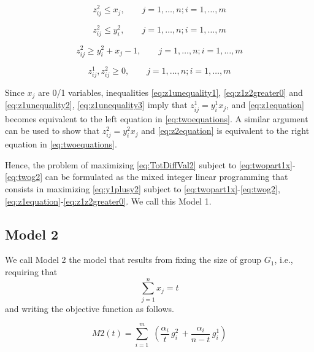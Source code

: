 \begin{equation}
z_{ij}^2 \leq x_j, \quad \quad j=1,\dots,n; i=1,\dots, m
\label{eq:z2unequality1}
\end{equation}

\begin{equation}
z_{ij}^2 \leq y_i^2, \quad \quad j=1,\dots,n; i=1,\dots, m
\label{eq:zoom2unequality2}
\end{equation}

\begin{equation}
z_{ij}^2 \geq y_i^2+x_j-1, \quad \quad j=1,\dots,n; i=1,\dots, m
\label{eq:z2unequality3}
\end{equation}

\begin{equation}
z_{ij}^1, z_{ij}^2 \geq 0, \quad \quad j=1,\dots,n; i=1,\dots, m
\label{eq:z1z2greater0}
\end{equation}

Since \(x_j\) are 0/1 variables, inequalities \eqref{eq:z1unequality1}, \eqref{eq:z1z2greater0} and \eqref{eq:z1unequality2}, \eqref{eq:z1unequality3} imply that \(z_{ij}^1=y_i^1 x_j\), and \eqref{eq:z1equation} becomes equivalent to the left equation in \eqref{eq:twoequations}. A similar argument can be used to show that \(z_{ij}^2=y_i^2 x_j\) and \eqref{eq:z2equation} is equivalent to the right equation in \eqref{eq:twoequations}.

Hence, the problem of maximizing \eqref{eq:TotDiffVal2} subject to \eqref{eq:twopart1x}-\eqref{eq:twog2} can be formulated as the mixed integer linear programming that consists in maximizing \eqref{eq:y1plusy2} subject to \eqref{eq:twopart1x}-\eqref{eq:twog2}, \eqref{eq:z1equation}-\eqref{eq:z1z2greater0}. We call this Model 1.

\subsection{Model 2}\label{Model2}

We call Model 2 the model that results from fixing the size of group \(G_1\), i.e., requiring that
\begin{equation}
\sum_{j=1}^n x_j=t
\label{eq:T}
\end{equation}
and writing the objective function as follows.

\begin{equation}
M2(t) = \displaystyle{\sum_{i=1}^m}\,\,
\left(\frac{\alpha_{i}}{t} \, g_i^2
\,+
\frac{\alpha_{i}}{n-t} \, g_i^1 \right)
\label{eq:TotDiffVal2T}
\end{equation}


